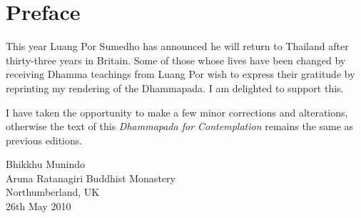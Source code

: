 
\chapter[Preface to the third edition (2010)]{Preface}

This year Luang Por Sumedho has announced he will return to Thailand after thirty-three years in Britain. Some  of  those whose  lives  have  been  changed  by  receiving Dhamma  teachings  from  Luang  Por  wish to  express  their  gratitude  by  reprinting my rendering of the Dhammapada. I am delighted to support this.

I have taken the opportunity to make a few minor corrections and alterations, otherwise the text of this \emph{Dhammapada for Contemplation} remains the same as previous editions.

\bigskip

{\raggedleft
Bhikkhu Munindo\\
Aruna Ratanagiri Buddhist Monastery\\
Northumberland, UK\\
26th May 2010
\par}
